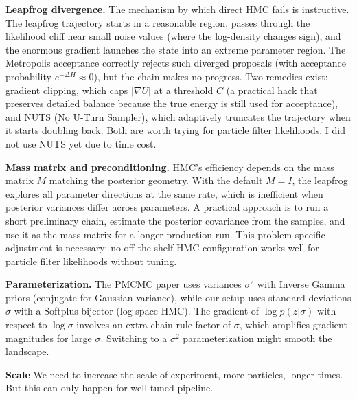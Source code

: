 \documentclass{article}
\begin{document}
\textbf{Leapfrog divergence.} The mechanism by which direct HMC fails is instructive. The leapfrog trajectory starts in a reasonable region, passes through the likelihood cliff near small noise values (where the log-density changes sign), and the enormous gradient launches the state into an extreme parameter region. The Metropolis acceptance correctly rejects such diverged proposals (with acceptance probability $e^{-\Delta H} \approx 0$), but the chain makes no progress. Two remedies exist: gradient clipping, which caps $|\nabla U|$ at a threshold $C$ (a practical hack that preserves detailed balance because the true energy is still used for acceptance), and NUTS (No U-Turn Sampler), which adaptively truncates the trajectory when it starts doubling back\cite{Neal-2012-MCMC-Hamiltonian-Dynamics-ARXIV-1206-1901v1}. Both are worth trying for particle filter likelihoods. I did not use NUTS yet due to time cost.

\textbf{Mass matrix and preconditioning.} HMC's efficiency depends on the mass matrix $M$ matching the posterior geometry. With the default $M = I$, the leapfrog explores all parameter directions at the same rate, which is inefficient when posterior variances differ across parameters. A practical approach is to run a short preliminary chain, estimate the posterior covariance from the samples, and use it as the mass matrix for a longer production run. This problem-specific adjustment is necessary: no off-the-shelf HMC configuration works well for particle filter likelihoods without tuning.

\textbf{Parameterization.} The PMCMC paper uses variances $\sigma^2$ with Inverse Gamma priors (conjugate for Gaussian variance), while our setup uses standard deviations $\sigma$ with a Softplus bijector (log-space HMC). The gradient of $\log p(z|\sigma)$ with respect to $\log \sigma$ involves an extra chain rule factor of $\sigma$, which amplifies gradient magnitudes for large $\sigma$. Switching to a $\sigma^2$ parameterization might smooth the landscape.

\textbf{Scale} We need to increase the scale of experiment, more particles, longer times. But this can only happen for well-tuned pipeline.



\end{document}
